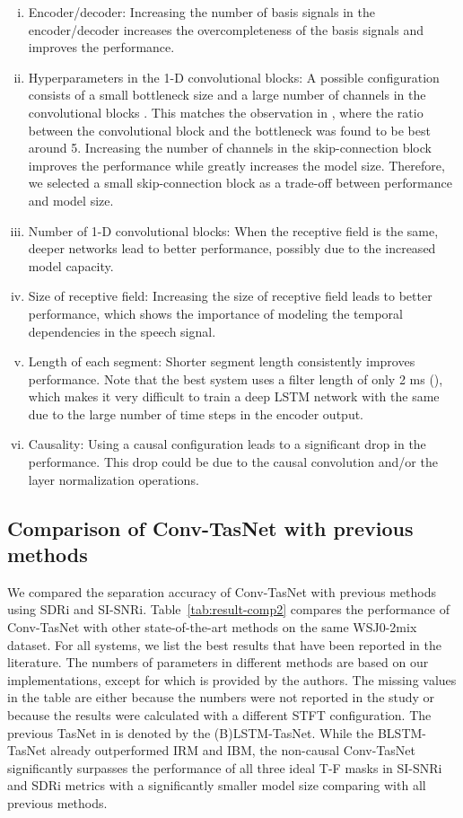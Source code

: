 \documentclass[journal]{IEEEtran}
\begin{document}
\begin{enumerate}[(i)]
    \item Encoder/decoder: Increasing the number of basis signals in the encoder/decoder increases the overcompleteness of the basis signals and improves the performance.
    \item Hyperparameters in the 1-D convolutional blocks: A possible configuration consists of a small bottleneck size  and a large number of channels in the convolutional blocks . This matches the observation in \cite{sandler2018mobilenetv2}, where the ratio between the convolutional block and the bottleneck  was found to be best around 5. Increasing the number of channels in the skip-connection block improves the performance while greatly increases the model size. Therefore, we selected a small skip-connection block as a trade-off between performance and model size.
    \item Number of 1-D convolutional blocks: When the receptive field is the same, deeper networks lead to better performance, possibly due to the increased model capacity.
    \item Size of receptive field: Increasing the size of receptive field leads to better performance, which shows the importance of modeling the temporal dependencies in the speech signal.
    \item Length of each segment: Shorter segment length consistently improves performance. Note that the best system uses a filter length of only 2 ms (), which makes it very difficult to train a deep LSTM network with the same  due to the large number of time steps in the encoder output.
    \item Causality: Using a causal configuration leads to a significant drop in the performance. This drop could be due to the causal convolution and/or the layer normalization operations.
\end{enumerate}

\subsection{Comparison of Conv-TasNet with previous methods}
\label{sec:exp-compare}

We compared the separation accuracy of Conv-TasNet with previous methods using SDRi and SI-SNRi. Table~\ref{tab:result-comp2} compares the performance of Conv-TasNet with other state-of-the-art methods on the same WSJ0-2mix dataset. For all systems, we list the best results that have been reported in the literature. The numbers of parameters in different methods are based on our implementations, except for \cite{li2018cbldnn} which is provided by the authors. The missing values in the table are either because the numbers were not reported in the study or because the results were calculated with a different STFT configuration. The previous TasNet in \cite{luo2018real} is denoted by the (B)LSTM-TasNet. While the BLSTM-TasNet already outperformed IRM and IBM, the non-causal Conv-TasNet significantly surpasses the performance of all three ideal T-F masks in SI-SNRi and SDRi metrics with a significantly smaller model size comparing with all previous methods.
\end{document}
